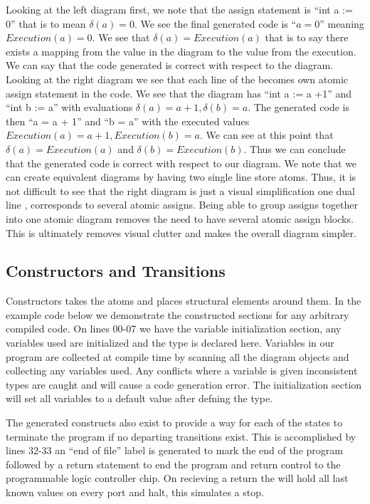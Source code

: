 Looking at the left diagram first, we note that the assign statement is ``int a := 0'' 
that is to mean $\delta(a) = 0$. We see the final generated code is ``$a = 0$'' 
meaning $Execution(a) = 0$. We see that $\delta(a) = Execution(a)$ that is to 
say there exists a mapping from the value in the diagram to the value from the execution. 
We can say that the code generated is correct with respect to the diagram. 
Looking at the right diagram we see that each line of the  
becomes own atomic assign statement in the code. We see that the diagram 
has ``int a := a +1'' and ``int b := a'' with evaluations $\delta(a) = a + 1, \delta(b) = a$. 
The generated code is then ``a = a + 1'' and ``b = a'' with the executed values 
$Execution(a) = a + 1, Execution(b) = a$. We can see at this point that $\delta(a) = Execution(a)$ 
and $\delta(b) = Execution(b)$. Thus we can conclude that the  
generated code is correct with respect to our diagram. We note that we can create equivalent 
diagrams by having two single line store atoms. 
Thus, it is not difficult to see that the right diagram is just a visual simplification one dual 
line , corresponds to several atomic assigns. Being able to group 
assigns together into one atomic diagram removes the need to have several atomic assign blocks.
This is ultimately removes visual clutter and makes the overall diagram simpler.


\subsection{Constructors and Transitions}

Constructors takes the atoms and places structural elements around them. 
In the example code below we demonstrate the constructed sections for any arbitrary 
compiled code. On lines 00-07 we have the variable initialization section, 
any variables used are initialized and the type is declared here.
Variables in our program are collected at compile time by scanning all the diagram 
objects and collecting any variables used. Any conflicts where a variable is given inconsistent types
are caught and will cause a code generation error. The initialization section will 
set all variables to a default value after defning the type.

The generated constructs also exist to provide a way for each of the states to terminate the program
if no departing transitions exist. This is accomplished by lines 32-33 an ``end of file'' label 
is generated to mark the end of the program followed by a return statement to end the 
program and return control to the programmable logic controller chip. On recieving a 
return the  will hold all last known values 
on every port and halt, this simulates a stop.


